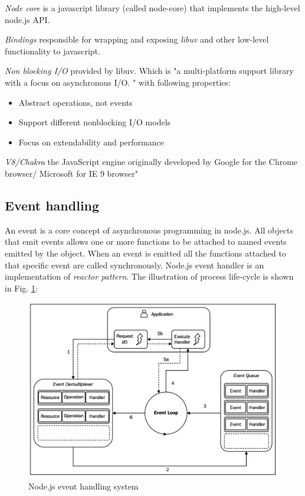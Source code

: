 \textit{Node core} is a javascript library (called node-core) that implements the high-level node.js API.

\textit{Bindings} responsible for wrapping and exposing \textit{libuv} and other low-level functionality to javascript.\cite{nodejsbook}

\textit{Non blocking I/O} provided by libuv\cite{nodejsabout}\cite{nodejsbook}. 
Which is "a multi-platform support library with a focus on asynchronous I/O. "\cite{libuv} with following properties\cite{libuvBasic}:
\begin{itemize}
\item Abstract operations, not events
\item Support different nonblocking I/O models
\item Focus on extendability and performance
\end{itemize}

\textit{V8/Chakra} the JavaScript engine originally developed by Google for the Chrome browser/ Microsoft for IE 9 browser"\cite{nodejsbook} 



\subsection{Event handling}
\label{subsec:event}
An event is a core concept of asynchronous programming in node.js. All objects that emit events allows one or more functions to be attached to named events emitted by the object. When an event is emitted all the functions attached to that specific event are called synchronously\cite{events}. Node.js  event handler is an implementation of \textit{reactor pattern}. The illustration of process life-cycle is shown in Fig. \ref{fig:nodeEvent}:

\begin{figure}[ht]
  	\label{fig:nodeEvent}
    \centering
    \includegraphics[width=\textwidth]{grafiken/nodeEventHandling.png}
     \caption{Node.js event handling system \cite{nodejsbook}}
  \end{figure}

